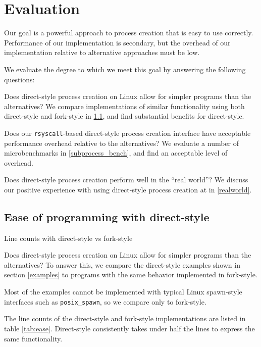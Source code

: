 \documentclass[letterpaper,twocolumn,10pt]{article}
\begin{document}
\section{Evaluation}\label{evaluation}
Our goal is a powerful approach to process creation that is easy to use correctly.
Performance of our implementation is secondary,
but the overhead of our implementation relative to alternative approaches
must be low.

We evaluate the degree to which we meet this goal by answering the following questions:
\begin{compactitem}
\item
  Does direct-style process creation on Linux allow for simpler programs than the alternatives?
  We compare implementations of similar functionality using both direct-style and fork-style in \ref{ease},
  and find substantial benefits for direct-style.
\item
  Does our \texttt{rsyscall}-based direct-style process creation interface
  have acceptable performance overhead relative to the alternatives?
  We evaluate a number of microbenchmarks in \ref{subprocess_bench},
  and find an acceptable level of overhead.
\item
  Does direct-style process creation perform well in the ``real world''?
  We discuss our positive experience with using direct-style process creation at \twosigma in \ref{realworld}.
\end{compactitem}
\subsection{Ease of programming with direct-style}\label{ease}
\begin{table}

\caption{Line counts with direct-style vs fork-style}
\label{tab:ease}
\end{table}
Does direct-style process creation on Linux allow for simpler programs than the alternatives?
To answer this, we compare the direct-style examples shown in section \ref{examples}
to programs with the same behavior implemented in fork-style.

Most of the examples cannot be implemented with typical Linux spawn-style interfaces such as \verb|posix_spawn|,
so we compare only to fork-style.

The line counts of the direct-style and fork-style implementations are listed in table \ref{tab:ease}.
Direct-style consistently takes under half the lines to express the same functionality.
\end{document}
